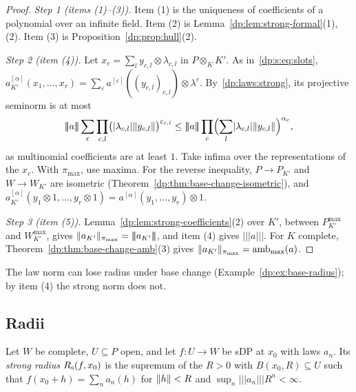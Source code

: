 \begin{proof}
\emph{Step 1 (items (1)--(3)).} Item (1) is the uniqueness of coefficients of a polynomial over an infinite field. Item (2) is Lemma~\ref{dp:lem:strong-formal}(1),(2). Item (3) is Proposition~\ref{dp:prop:hull}(2).

\emph{Step 2 (item (4)).} Let $x_c=\sum_ly_{c,l}\otimes\lambda_{c,l}$ in $P\otimes_KK'$. As in~\eqref{dp:s:eq:slots}, $a_{K'}^{[\alpha]}(x_1,\dots,x_r)=\sum_\varepsilon a^{[\varepsilon]}((y_{c,l})_{c,l})\otimes\lambda^\varepsilon$. By~\eqref{dp:laws:strong}, its projective seminorm is at most
\[
 \lvert\!\lvert\!\lvert a\rvert\!\rvert\!\rvert\sum_\varepsilon\prod_{c,l}\bigl(\abs{\lambda_{c,l}}\norm{y_{c,l}}\bigr)^{\varepsilon_{c,l}}\le\lvert\!\lvert\!\lvert a\rvert\!\rvert\!\rvert\prod_c\Bigl(\sum_l\abs{\lambda_{c,l}}\norm{y_{c,l}}\Bigr)^{\alpha_c},
\]
as multinomial coefficients are at least $1$. Take infima over the representations of the $x_c$. With $\pi_{\max}$, use maxima. For the reverse inequality, $P\to P_{K'}$ and $W\to W_{K'}$ are isometric (Theorem~\ref{dp:thm:base-change-isometric}), and $a_{K'}^{[\alpha]}(y_1\otimes1,\dots,y_r\otimes1)=a^{[\alpha]}(y_1,\dots,y_r)\otimes1$.

\emph{Step 3 (item (5)).} Lemma~\ref{dp:lem:strong-coefficients}(2) over $K'$, between $P^{\max}_{K'}$ and $W^{\max}_{K'}$, gives $\lVert a_{K'}\rVert_{\pi_{\max}}=\lvert\!\lvert\!\lvert a_{K'}\rvert\!\rvert\!\rvert$, and item (4) gives $\lvert\!\lvert\!\lvert a\rvert\!\rvert\!\rvert$. For $K$ complete, Theorem~\ref{dp:thm:base-change-amb}(3) gives $\lVert a_{K'}\rVert_{\pi_{\max}}=\operatorname{amb}_{\max}(a)$.
\end{proof}

The law norm can lose radius under base change (Example~\ref{dp:ex:base-radius}); by item (4) the strong norm does not.

\subsection{Radii}\label{dp:s:ssec-radii}

Let $W$ be complete, $U\subseteq P$ open, and let $f\colon U\to W$ be sDP at $x_0$ with laws $a_n$. Its \emph{strong radius} $R_{\rm s}(f,x_0)$ is the supremum of the $R>0$ with $B(x_0,R)\subseteq U$ such that $f(x_0+h)=\sum_na_n(h)$ for $\lVert h\rVert<R$ and $\sup_n\lvert\!\lvert\!\lvert a_n\rvert\!\rvert\!\rvert R^n<\infty$.

